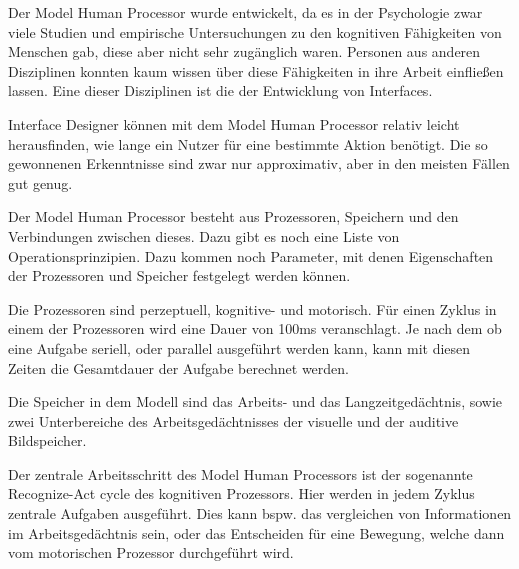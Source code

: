 \documentclass[a4paper,10pt]{article}
\begin{document}
\kopf
\renewcommand{\figurename}{Abbildung}

Der Model Human Processor wurde entwickelt, da es in der Psychologie zwar viele Studien und empirische Untersuchungen zu den kognitiven Fähigkeiten von Menschen gab, diese aber nicht sehr zugänglich waren. Personen aus anderen Disziplinen konnten kaum wissen über diese Fähigkeiten in ihre Arbeit einfließen lassen. Eine dieser Disziplinen ist die der Entwicklung von Interfaces.

Interface Designer können mit dem Model Human Processor relativ leicht herausfinden, wie lange ein Nutzer für eine bestimmte Aktion benötigt. Die so gewonnenen Erkenntnisse sind zwar nur approximativ, aber in den meisten Fällen gut genug.

Der Model Human Processor besteht aus Prozessoren, Speichern und den Verbindungen zwischen dieses. Dazu gibt es noch eine Liste von Operationsprinzipien. Dazu kommen noch Parameter, mit denen Eigenschaften der Prozessoren und Speicher festgelegt werden können.

Die Prozessoren sind perzeptuell, kognitive- und motorisch. Für einen Zyklus in einem der Prozessoren wird eine Dauer von 100ms veranschlagt. Je nach dem ob eine Aufgabe seriell, oder parallel ausgeführt werden kann, kann mit diesen Zeiten die Gesamtdauer der Aufgabe berechnet werden.

Die Speicher in dem Modell sind das Arbeits- und das Langzeitgedächtnis, sowie zwei Unterbereiche des Arbeitsgedächtnisses der visuelle und der auditive Bildspeicher.

Der zentrale Arbeitsschritt des Model Human Processors ist der sogenannte Recognize-Act cycle des kognitiven Prozessors. Hier werden in jedem Zyklus zentrale Aufgaben ausgeführt. Dies kann bspw. das vergleichen von Informationen im Arbeitsgedächtnis sein, oder das Entscheiden für eine Bewegung, welche dann vom motorischen Prozessor durchgeführt wird.
\end{document}
